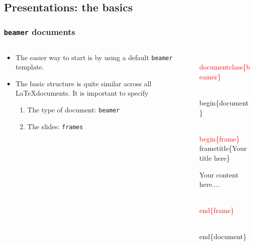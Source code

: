 \documentclass[10pt]{beamer}
\newcommand{\code}{\textcolor{red}}
\begin{document}
       \subsection{Presentations: the basics}

       
  
       
\begin{frame}
\frametitle{\texttt{beamer} documents}
       
          \begin{columns}
       
       
 \begin{column}{0.5\textwidth}
   \begin{itemize}
   \item The easier way to start is by using a default \texttt{beamer} template. 
   \item The  basic structure is quite similar across all \LaTeX documents. It is important 
   to specify

       \begin{enumerate}
         \item The type of document: \texttt{beamer} 
         \item The slides: \texttt{frames} 

       \end{enumerate}
  
  
  \end{itemize}    
      
 \end{column}
 
\begin{column}{0.5\textwidth}
   
   
 \begin{semiverbatim}

\code{\\documentclass\{beamer\}}

\\begin\{document\}

\code{\\begin\{frame\}}
\\frametitle\{Your title here\}
 
 Your content here....


\code{\\end\{frame\}}

\\end\{document\}
  
  


\end{semiverbatim}

 
      
  
 \end{column}
 

       \end{columns}
       \end{frame}
\end{document}
